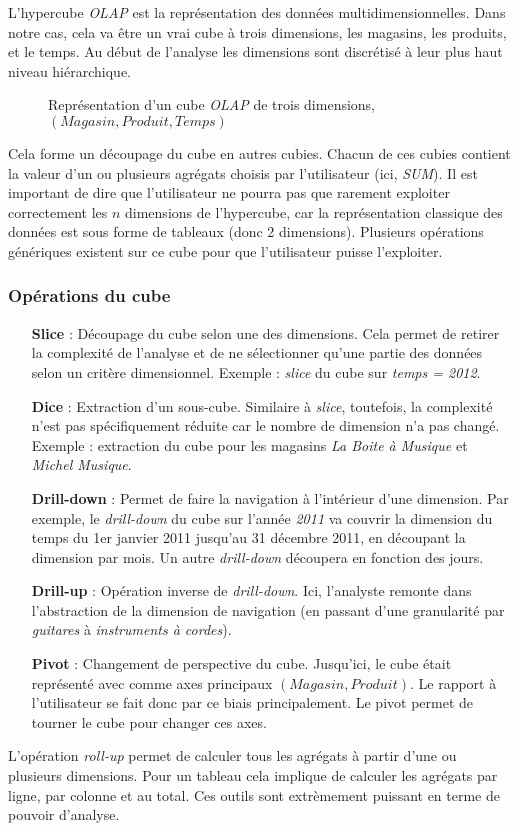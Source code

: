 L'hypercube \textit{OLAP} est la représentation des données multidimensionnelles. Dans notre cas, cela va être un vrai cube à trois dimensions, les magasins, les produits, et le temps. Au début de l'analyse les dimensions sont discrétisé à leur plus haut niveau hiérarchique.
\begin{figure}[ht]
	\centering
	\TODO{}
	\caption{Représentation d'un cube \textit{OLAP} de trois dimensions, $(Magasin, Produit, Temps)$}
\end{figure}
Cela forme un découpage du cube en autres cubies. Chacun de ces cubies contient la valeur d'un ou plusieurs agrégats choisis par l'utilisateur (ici, \textit{SUM}). Il est important de dire que l'utilisateur ne pourra pas que rarement exploiter correctement les $n$ dimensions de l'hypercube, car la représentation classique des données est sous forme de tableaux (donc 2 dimensions). Plusieurs opérations génériques existent sur ce cube pour que l'utilisateur puisse l'exploiter.

\subsubsection{Opérations du cube}
\begin{itemize}
	\item[\textbf{Slice}] : Découpage du cube selon une des dimensions. Cela permet de retirer la complexité de l'analyse et de ne sélectionner qu'une partie des données selon un critère dimensionnel. Exemple : \textit{slice} du cube sur \textit{temps = 2012}.
	\item[\textbf{Dice}] : Extraction d'un sous-cube. Similaire à \textit{slice}, toutefois, la complexité n'est pas spécifiquement réduite car le nombre de dimension n'a pas changé. Exemple : extraction du cube pour les magasins \textit{La Boite à Musique} et \textit{Michel Musique}.
	\item[\textbf{Drill-down}] : Permet de faire la navigation à l'intérieur d'une dimension. Par exemple, le \textit{drill-down} du cube sur l'année \textit{2011} va couvrir la dimension du temps du 1er janvier 2011 jusqu'au 31 décembre 2011, en découpant la dimension par mois. Un autre \textit{drill-down} découpera en fonction des jours.
	\item[\textbf{Drill-up}] : Opération inverse de \textit{drill-down}. Ici, l'analyste remonte dans l'abstraction de la dimension de navigation (en passant d'une granularité par \textit{guitares} à \textit{instruments à cordes}).
	\item[\textbf{Pivot}] : Changement de perspective du cube. Jusqu'ici, le cube était représenté avec comme axes principaux $(Magasin, Produit)$. Le rapport à l'utilisateur se fait donc par ce biais principalement. Le pivot permet de tourner le cube pour changer ces axes.
\end{itemize}
L'opération \textit{roll-up} permet de calculer tous les agrégats à partir d'une ou plusieurs dimensions. Pour un tableau cela implique de calculer les agrégats par ligne, par colonne et au total. Ces outils sont extrèmement puissant en terme de pouvoir d'analyse.

